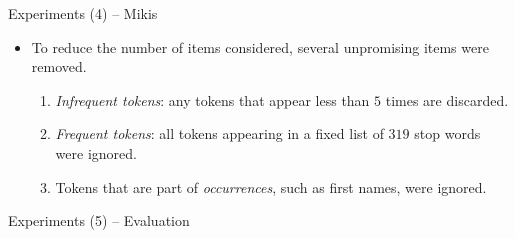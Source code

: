 \documentclass[12pt]{beamer}
\theoremstyle{break}
\DeclarePairedDelimiter\abs{\lvert}{\rvert}%
\begin{document}


\begin{frame}{Experiments (4) -- Mikis}

	\begin{itemize}
		\item To reduce the number of items considered, several unpromising items were removed. \begin{enumerate}
    			\item \emph{Infrequent tokens}: any tokens that appear less than $5$ times are discarded.
    			\item \emph{Frequent tokens}: all tokens appearing in a fixed list of $319$ stop words were ignored.
    			\item Tokens that are part of \emph{occurrences}, such as first names, were ignored.
				\end{enumerate}	
	\end{itemize}
\end{frame}




\begin{frame}{Experiments (5) -- Evaluation}

	
	
\end{frame}


\end{document}
